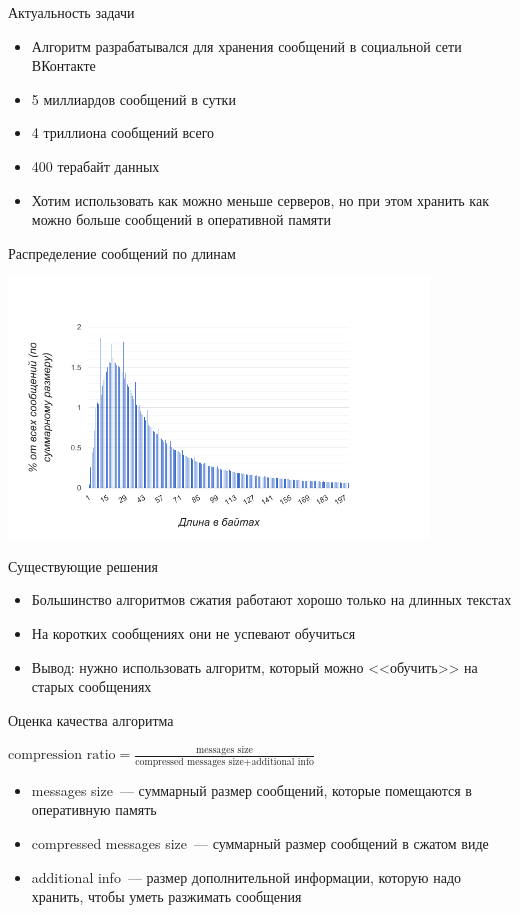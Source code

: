 \documentclass[t,13pt,graphics=pdflatex,xcolor=table,aspectratio=43]{beamer}
\begin{document}
\begin{frame}{Актуальность задачи}
\begin{itemize}
    \item Алгоритм разрабатывался для хранения сообщений в социальной сети ВКонтакте
    \item 5 миллиардов сообщений в сутки
    \item 4 триллиона сообщений всего
    \item 400 терабайт данных
    \item Хотим использовать как можно меньше серверов, но при этом хранить как можно больше сообщений в оперативной памяти
\end{itemize}
\end{frame}

\begin{frame}{Распределение сообщений по длинам}
\begin{center}
\includegraphics[width=4.4in]{pics/msgs-len.png}
\end{center}
\end{frame}


\begin{frame}{Существующие решения}
\begin{itemize}
    \item Большинство алгоритмов сжатия работают хорошо только на длинных текстах
    \item На коротких сообщениях они не успевают обучиться
    \item Вывод: нужно использовать алгоритм, который можно <<обучить>> на старых сообщениях
\end{itemize}
\end{frame}


\begin{frame}{Оценка качества алгоритма}
\begin{center}
$ \text{compression ratio} = \frac{\text{messages size}}{\text{compressed messages size} + \text{additional info}} $
\end{center}
\begin{itemize}
    \item messages size~--- суммарный размер сообщений, которые помещаются в оперативную память
    \item compressed messages size~--- суммарный размер сообщений в сжатом виде
    \item additional info~--- размер дополнительной информации, которую надо хранить, чтобы уметь разжимать сообщения
\end{itemize}
\end{frame}
\end{document}
